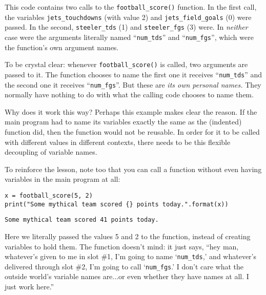 This code contains two calls to the \texttt{football\_score()} function. In the
first call, the variables \texttt{jets\_touchdowns} (with value 2) and
\texttt{jets\_field\_goals} (0) were passed. In the second,
\texttt{steeler\_tds} (1) and \texttt{steeler\_fgs} (3) were. In
\textit{neither} case were the arguments literally named ``\texttt{num\_tds}''
and ``\texttt{num\_fgs}'', which were the function's own argument names.

To be crystal clear: whenever \texttt{football\_score()} is called, two
arguments are passed to it. The function chooses to name the first one it
receives ``\texttt{num\_tds}'' and the second one it receives
``\texttt{num\_fgs}''. But these are \textit{its own personal names.} They
normally have nothing to do with what the calling code chooses to name them.

Why does it work this way? Perhaps this example makes clear the reason. If the
main program had to name its variables exactly the same as the (indented)
function did, then the function would not be reusable. In order for it to be
called with different values in different contexts, there needs to be this
flexible decoupling of variable names.

To reinforce the lesson, note too that you can call a function without even
having variables in the main program at all:

\begin{Verbatim}[fontsize=\small,samepage=true,frame=single,framesep=3mm]
x = football_score(5, 2)
print("Some mythical team scored {} points today.".format(x))
\end{Verbatim}
\vspace{-.2in}

\begin{Verbatim}[fontsize=\small,samepage=true,frame=leftline,framesep=5mm,framerule=1mm]
Some mythical team scored 41 points today.
\end{Verbatim}

Here we literally passed the values 5 and 2 to the function, instead of
creating variables to hold them. The function doesn't mind: it just says, ``hey
man, whatever's given to me in slot \#1, I'm going to name `\texttt{num\_tds},'
and whatever's delivered through slot \#2, I'm going to call
`\texttt{num\_fgs}.' I don't care what the outside world's variable names
are...or even whether they have names at all. I just work here.''
